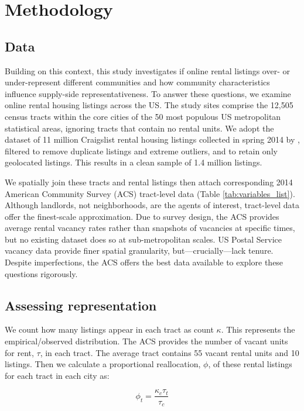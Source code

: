 \documentclass[11pt,onecolumn]{article} %
\begin{document}
\section{Methodology}

\subsection{Data}

Building on this context, this study investigates if online rental listings over- or under-represent different communities and how community characteristics influence supply-side representativeness. To answer these questions, we examine online rental housing listings across the US. The study sites comprise the 12,505 census tracts within the core cities of the 50 most populous US metropolitan statistical areas, ignoring tracts that contain no rental units. We adopt the dataset of 11 million Craigslist rental housing listings collected in spring 2014 by \citet{boeing_new_2017}, filtered to remove duplicate listings and extreme outliers, and to retain only geolocated listings. This results in a clean sample of 1.4 million listings.

We spatially join these tracts and rental listings then attach corresponding 2014 American Community Survey (ACS) tract-level data (Table \ref{tab:variables_list}). Although landlords, not neighborhoods, are the agents of interest, tract-level data offer the finest-scale approximation. Due to survey design, the ACS provides average rental vacancy rates rather than snapshots of vacancies at specific times, but no existing dataset does so at sub-metropolitan scales. US Postal Service vacancy data provide finer spatial granularity, but---crucially---lack tenure. Despite imperfections, the ACS offers the best data available to explore these questions rigorously.


\subsection{Assessing representation}

We count how many listings appear in each tract as count $\kappa$. This represents the empirical/observed distribution. The ACS provides the number of vacant units for rent, $\tau$, in each tract. The average tract contains 55 vacant rental units and 10 listings. Then we calculate a proportional reallocation, $\phi$, of these rental listings for each tract in each city as:

\begin{equation}
	\label{eq:allocation}
	\phi_t = \frac{\kappa_c \tau_t}{\tau_c}
\end{equation}
\end{document}
